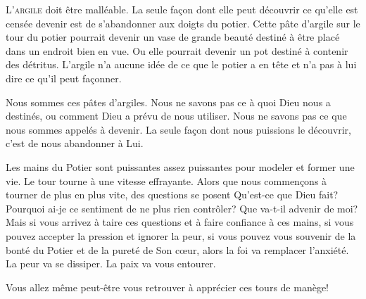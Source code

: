



\lettrine{L}{'argile} doit être malléable.
 La seule fa\c{c}on dont elle peut découvrir ce qu'elle est censée devenir
 est de s'abandonner aux doigts du potier.
 Cette pâte d'argile sur le tour du potier pourrait devenir
 un vase de grande beauté destiné à être placé dans un endroit
 bien en vue. Ou elle pourrait devenir un pot destiné à contenir
 des détritus. L'argile n'a aucune idée de ce que le potier
 a en tête et n'a pas à lui dire ce qu'il peut fa\c{c}onner.

Nous sommes ces pâtes d'argiles.
 Nous ne savons pas ce à quoi Dieu nous a destinés,
 ou comment Dieu a prévu de nous utiliser.
 Nous ne savons pas ce que nous sommes appelés à devenir.
 La seule fa\c{c}on dont nous puissions le découvrir,
 c'est de nous abandonner à Lui.


Les mains du Potier sont puissantes \ocadr assez puissantes pour modeler
 et former une vie. Le tour tourne à une vitesse effrayante.
 Alors que nous commen\c{c}ons à tourner de plus en plus vite,
 des questions se posent\frcolon{} Qu'est-ce que Dieu fait?
 Pourquoi ai-je ce sentiment de ne plus rien contrôler?
 Que va-t-il advenir de moi? Mais si vous arrivez à taire ces questions
 et à faire confiance à ces mains, si vous pouvez accepter la pression
 et ignorer la peur, si vous pouvez vous souvenir de la bonté du Potier
 et de la pureté de Son c\oe{}ur, alors la foi va remplacer l'anxiété.
 La peur va se dissiper. La paix va vous entourer.

Vous allez même peut-être vous retrouver à apprécier ces tours de manège!

\dvrule



